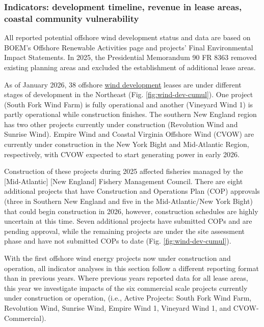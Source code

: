 \documentclass[
  10pt,
]{article}
\begin{document}
\subsubsection{Indicators: development timeline, revenue in lease areas, coastal community vulnerability}\label{indicators-development-timeline-revenue-in-lease-areas-coastal-community-vulnerability}

All reported potential offshore wind development status and data are based on BOEM's Offshore Renewable Activities page and projects' Final Environmental Impact Statements. In 2025, the Presidential Memorandum 90 FR 8363 removed existing planning areas and excluded the establishment of additional lease areas.

As of January 2026, 38 offshore \href{https://noaa-edab.github.io/catalog/wind_dev_speed.html}{wind development} leases are under different stages of development in the Northeast (Fig. \ref{fig:wind-dev-cumul}). One project (South Fork Wind Farm) is fully operational and another (Vineyard Wind 1) is partly operational while construction finishes. The southern New England region has two other projects currently under construction (Revolution Wind and Sunrise Wind). Empire Wind and Coastal Virginia Offshore Wind (CVOW) are currently under construction in the New York Bight and Mid-Atlantic Region, respectively, with CVOW expected to start generating power in early 2026.

Construction of these projects during 2025 affected fisheries managed by the {[}Mid-Atlantic{]} {[}New England{]} Fishery Management Council. There are eight additional projects that have Construction and Operations Plan (COP) approvals (three in Southern New England and five in the Mid-Atlantic/New York Bight) that could begin construction in 2026, however, construction schedules are highly uncertain at this time. Seven additional projects have submitted COPs and are pending approval, while the remaining projects are under the site assessment phase and have not submitted COPs to date (Fig. \ref{fig:wind-dev-cumul}).

With the first offshore wind energy projects now under construction and operation, all indicator analyses in this section follow a different reporting format than in previous years. Where previous years reported data for all lease areas, this year we investigate impacts of the six commercial scale projects currently under construction or operation, (i.e., Active Projects: South Fork Wind Farm, Revolution Wind, Sunrise Wind, Empire Wind 1, Vineyard Wind 1, and CVOW-Commercial).
\end{document}
